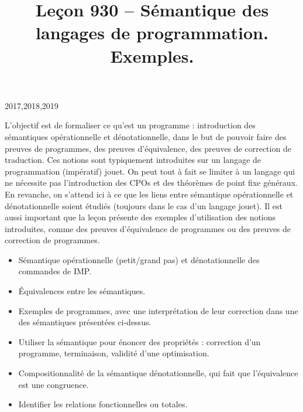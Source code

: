 \documentclass{agregfiche}
\title{Leçon 930 -- Sémantique des langages de programmation. Exemples.}
\begin{document}
\maketitle

\secrapports

\begin{rapport}{2017,2018,2019}

    L’objectif est de formaliser ce qu’est un programme : introduction des
    sémantiques opérationnelle et dénotationnelle, dans le but de pouvoir faire
    des preuves de programmes, des preuves d’équivalence, des preuves de
    correction de traduction. Ces notions sont typiquement introduites sur un
    langage de programmation (impératif) jouet. On peut tout à fait se limiter à
    un langage qui ne nécessite pas l’introduction des CPOs et des théorèmes de
    point fixe généraux. En revanche, on s’attend ici à ce que les liens entre
    sémantique opérationnelle et dénotationnelle soient étudiés (toujours dans le
    cas d’un langage jouet). Il est aussi important que la leçon présente des
    exemples d’utilisation des notions introduites, comme des preuves
    d’équivalence de programmes ou des preuves de correction de programmes.

\end{rapport}

\secindispensables

\begin{itemize}
    \item Sémantique opérationnelle (petit/grand pas) et dénotationnelle des commandes de IMP.
    \item Équivalences entre les
        sémantiques.
     \item Exemples de programmes, avec une interprétation de leur
     correction dans une des sémantiques présentées ci-dessus.
\end{itemize}

\secasavoir

\begin{itemize}
	\item Utiliser la sémantique pour énoncer des propriétés : correction d'un
	programme, terminaison, validité d'une optimisation.
    \item Compositionnalité de la sémantique dénotationnelle, qui fait que l'équivalence est une congruence.
    \item Identifier les relations fonctionnelles ou totales.
\end{itemize}
\end{document}
